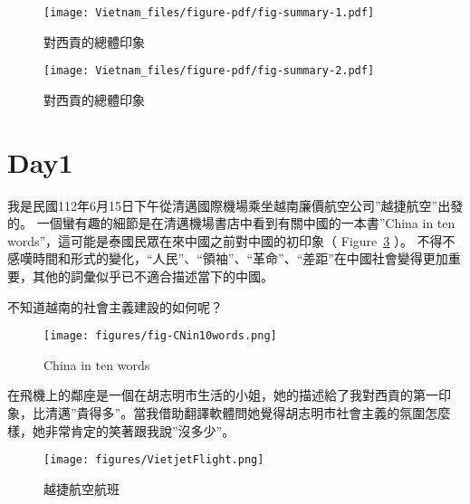 \documentclass[
  a4paper,
]{ctexart}
\begin{document}
\begin{figure}

{\centering \texttt{[image: Vietnam\_files/figure-pdf/fig-summary-1.pdf]}

}

\caption{\label{fig-summary-1}對西貢的總體印象}

\end{figure}

\begin{figure}

{\centering \texttt{[image: Vietnam\_files/figure-pdf/fig-summary-2.pdf]}

}

\caption{\label{fig-summary-2}對西貢的總體印象}

\end{figure}

\hypertarget{day1}{%
\section{Day1}\label{day1}}

我是民國112年6月15日下午從清邁國際機場乘坐越南廉價航空公司''越捷航空''出發的。
一個蠻有趣的細節是在清邁機場書店中看到有關中國的一本書''China in ten
words''，這可能是泰國民眾在來中國之前對中國的初印象（
Figure~\ref{fig-CNin10words} ）。
不得不感嘆時間和形式的變化，``人民''、``領袖''、``革命''、``差距''在中國社會變得更加重要，其他的詞彙似乎已不適合描述當下的中國。

不知道越南的社會主義建設的如何呢？

\begin{figure}

{\centering \texttt{[image: figures/fig-CNin10words.png]}

}

\caption{\label{fig-CNin10words}China in ten words}

\end{figure}

在飛機上的鄰座是一個在胡志明市生活的小姐，她的描述給了我對西貢的第一印象，比清邁''貴得多''。當我借助翻譯軟體問她覺得胡志明市社會主義的氛圍怎麼樣，她非常肯定的笑著跟我說''沒多少''。

\begin{figure}

{\centering \texttt{[image: figures/VietjetFlight.png]}

}

\caption{越捷航空航班}

\end{figure}
\end{document}
